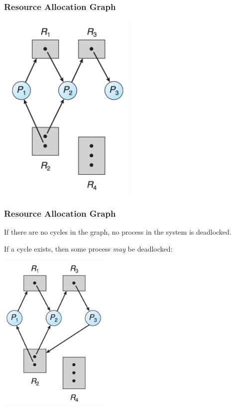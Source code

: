 \begin{frame}
\frametitle{Resource Allocation Graph}

\begin{center}
\includegraphics[width=0.50\textwidth]{images/rag1.png}
\end{center}

\end{frame}

\begin{frame}
\frametitle{Resource Allocation Graph}

If there are no cycles in the graph, no process in the system is deadlocked. 

If a cycle exists, then some process \textit{may} be deadlocked:

\begin{center}
\includegraphics[width=0.40\textwidth]{images/rag2.png}
\end{center}

\end{frame}

